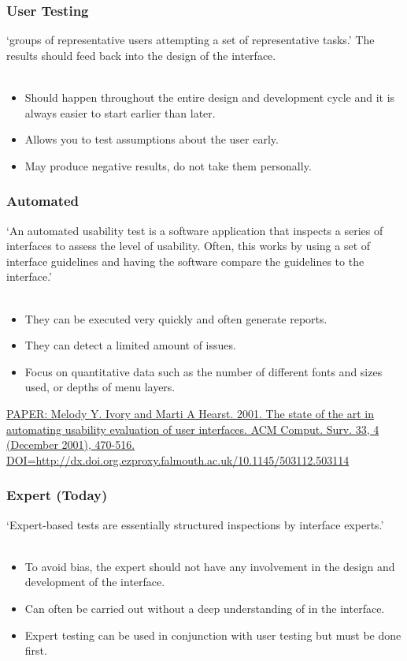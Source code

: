 \begin{frame}
	\frametitle{User Testing}
	
	`groups of representative users attempting a set of representative tasks.' The results should feed back into the design of the interface. \\~\\
	
	\begin{itemize}
		\item Should happen throughout the entire design and development cycle and it is always easier to start earlier than later.
		\item Allows you to test assumptions about the user early. 
		\item May produce negative results, do not take them personally. 
	\end{itemize}
\end{frame}

\begin{frame}
	\frametitle{Automated}
	
	`An automated usability test is a software application that inspects a series of interfaces to assess the level of usability. Often, this works by using a set of interface guidelines and having the software compare the guidelines to the interface.' \\~\\
	
	\begin{itemize}
		\item They can be executed very quickly and often generate reports.  
		\item They can detect a limited amount of issues. 
		\item Focus on quantitative data such as the number of different fonts and sizes used, or depths of menu layers. 
	\end{itemize}
		
	\tiny {\href{https://dl-acm-org.ezproxy.falmouth.ac.uk/citation.cfm?id=503114}{PAPER: Melody Y. Ivory and Marti A Hearst. 2001. The state of the art in automating usability evaluation of user interfaces. ACM Comput. Surv. 33, 4 (December 2001), 470-516. DOI=http://dx.doi.org.ezproxy.falmouth.ac.uk/10.1145/503112.503114}}
\end{frame}

\begin{frame}
	\frametitle{Expert (Today) }
	
	`Expert-based tests are essentially structured inspections by interface experts.' \\~\\
	
	\begin{itemize}
		\item To avoid bias, the expert should not have any involvement in the design and development of the interface. 
		\item Can often be carried out without a deep understanding of  in the interface.
		\item Expert testing can be used in conjunction with user testing but must be done first. 
	\end{itemize}
		
\end{frame}

